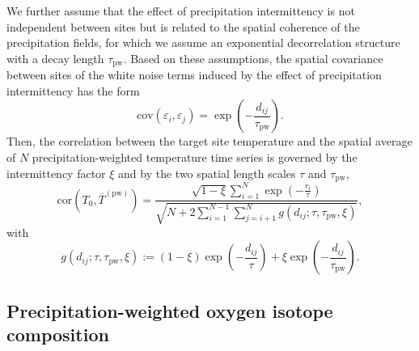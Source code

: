 \documentclass[cp, manuscript]{copernicus}
\begin{document}
We further assume that the effect of precipitation intermittency is not
independent between sites but is related to the spatial coherence of the
precipitation fields, for which we assume an exponential decorrelation structure
with a decay length $\tau_{\mathrm{pw}}$. Based on these assumptions, the
spatial covariance between sites of the white noise terms induced by the effect
of precipitation intermittency has the form
%
\begin{equation}
\label{eq:noise.cov}
\mathrm{cov}(\varepsilon_i,\varepsilon_j)=
\exp{\left(-\frac{d_{ij}}{\tau_{\mathrm{pw}}}\right)}.
\end{equation}
%
Then, the correlation between the target site temperature and the spatial
average of $N$ precipitation-weighted temperature time series is governed by the
intermittency factor $\xi$ and by the two spatial length scales $\tau$ and
$\tau_{\mathrm{pw}}$,
%
\begin{equation}
\label{eq:t2m.pw.corr}
\mathrm{cor}\left(T_0,\overline{T}^{\mathrm{(pw)}}\right)=
\frac
{\sqrt{1-\xi}\sum_{i=1}^{N}\exp{\left(-\frac{r_i}{\tau}\right)}}
{\sqrt{N + 2\sum_{i=1}^{N-1}\sum_{j=i+1}^{N}
  g(d_{ij}; \tau, \tau_{\mathrm{pw}}, \xi)}},
\end{equation}
%
with
\begin{equation}
\label{eq:exp.fun}
g(d_{ij}; \tau, \tau_{\mathrm{pw}}, \xi):=
(1-\xi)\exp{\left(-\frac{d_{ij}}{\tau}\right)} +
\xi\exp{\left(-\frac{d_{ij}}{\tau_{\mathrm{pw}}}\right)}.
\end{equation}

\subsection{Precipitation-weighted oxygen isotope composition}
\label{app:concept.model.oxy.pw}
\end{document}
